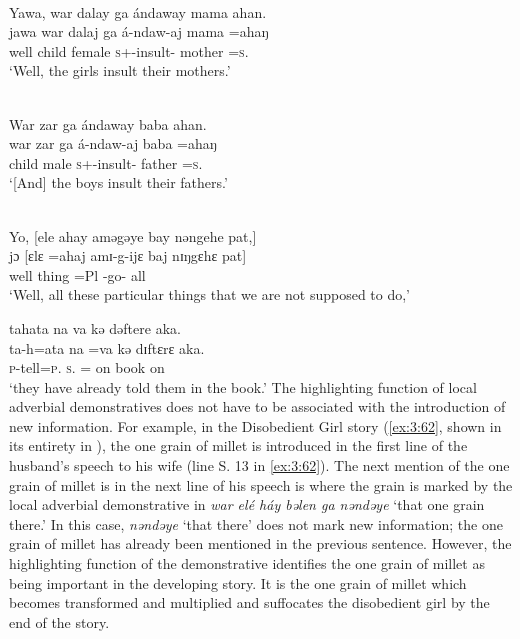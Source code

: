 \medskip 
{}\\
{Yawa,  war  dalay  ga ándaway  mama  ahan.}\\
\gll jawa   war   dalaj  ga  á-ndaw-aj   mama   =ahaŋ\\
     well    child  female  {\ADJ}  \textsc{s}+{\IFV}-insult{}-{\CL}  mother  =\textsc{s}.{\POSS}  \\
\glt ‘Well, the girls insult their mothers.’ 

\medskip
{}\\
War  zar  ga  ándaway  baba  ahan.\\
\gll war     zar  ga  á-ndaw-aj   baba   =ahaŋ\\
    child  male  {\ADJ}  \textsc{s}+{\IFV}-insult{}-{\CL}  father  =\textsc{s}.{\POSS}\\
\glt ‘[And] the boys insult their fathers.’ 

\medskip
{}\\ 
Yo, [ele  ahay  aməgəye  bay  nəngehe pat,]\\
\gll jɔ   [ɛlɛ  =ahaj  amɪ-g-ijɛ            baj   nɪŋgɛhɛ   pat] \\
   well    thing  =Pl  {\DEP}-go-{\CL}     {\NEG}  {\DEM}     all  \\
\glt ‘Well, all these particular things that we are not supposed to do,’ 
   
\medskip

tahata  na  va  kə dəftere  aka.\\
\gll ta-h=ata        na  =va   kə   dɪftɛrɛ  aka. \\
   \textsc{p}-tell=\textsc{p}.{\IO}    \textsc{s}.{\DO}  ={\PRF}   on  book  on\\
\glt ‘they have already told them in the book.’ 
\z
\largerpage
The highlighting function of local adverbial demonstratives does not have to be associated with the introduction of new information. For example, in the Disobedient Girl story (\ref{ex:3:62}, shown in its entirety in ), the one grain of millet is introduced in the first line of the husband’s speech to his wife (line S. 13 in \ref{ex:3:62}). The next mention of the one grain of millet is in the next line of his speech is where the grain is marked by the local adverbial demonstrative in \textit{war elé háy bəlen ga nəndəye} ‘that one grain there.’ In this case, \textit{nəndəye} ‘that there’ does not mark new information; the one grain of millet has already been mentioned in the previous sentence. However, the highlighting function of the demonstrative identifies the one grain of millet as being important in the developing story. It is the one grain of millet which becomes transformed and multiplied and suffocates the disobedient girl by the end of the story. 

